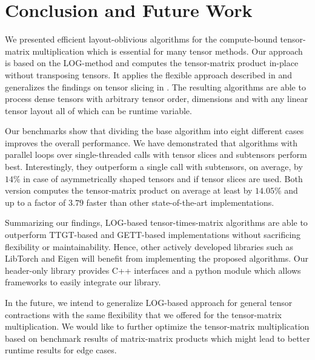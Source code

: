 \section{Conclusion and Future Work}
\label{sec:conclusion}
We presented efficient layout-oblivious algorithms for the compute-bound tensor-matrix multiplication which is essential for many tensor methods.
Our approach is based on the LOG-method and computes the tensor-matrix product in-place without transposing tensors.
It applies the flexible approach described in \cite{bassoy:2019:ttv} and generalizes the findings on tensor slicing in \cite{li:2015:input}.
The resulting algorithms are able to process dense tensors with arbitrary tensor order, dimensions and with any linear tensor layout all of which can be runtime variable.

Our benchmarks show that dividing the base algorithm into eight different  cases improves the overall performance.
We have demonstrated that algorithms with parallel loops over single-threaded  calls with tensor slices and subtensors perform best.
Interestingly, they outperform a single  call with subtensors, on average, by $14$\% in case of asymmetrically shaped tensors and if tensor slices are used.
Both version computes the tensor-matrix product on average at least by $14.05$\% and up to a factor of $3.79$ faster than other state-of-the-art implementations.


Summarizing our findings, LOG-based tensor-times-matrix algorithms are able to outperform TTGT-based and GETT-based implementations without sacrificing flexibility or maintainability.
Hence, other actively developed libraries such as LibTorch and Eigen will benefit from implementing the proposed algorithms.
Our header-only library provides C++ interfaces and a python module which allows frameworks to easily integrate our library.

In the future, we intend to generalize LOG-based approach for general tensor contractions with the same flexibility that we offered for the tensor-matrix multiplication. 
We would like to further optimize the tensor-matrix multiplication based on benchmark results of matrix-matrix products which might lead to better runtime results for edge cases.

